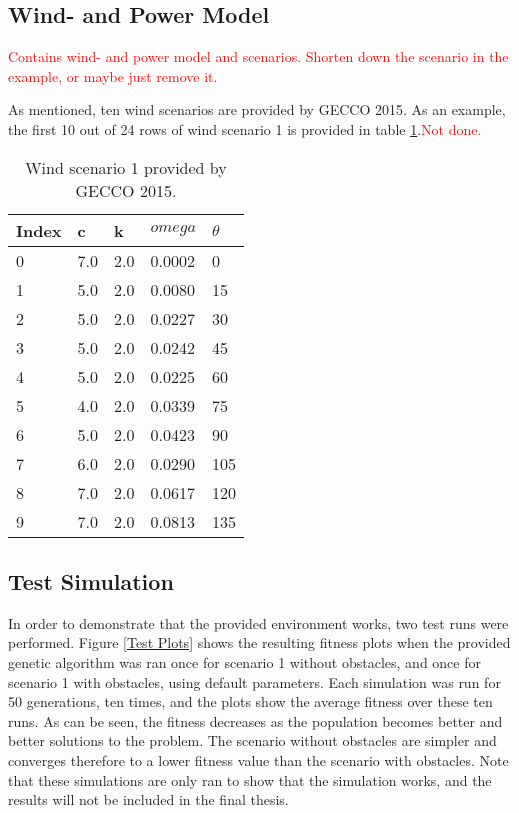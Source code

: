 \subsection{Wind- and Power Model}
\textcolor{red}{Contains wind- and power model and scenarios. Shorten down the scenario in the example, or maybe just remove it.}


As mentioned, ten wind scenarios are provided by GECCO 2015. As an example, the first 10 out of 24 rows of wind scenario 1 is provided in table \ref{Wind scenario 1}.\textcolor{red}{Not done.}


\begin{table}[h!]
\begin{center}
\caption{Wind scenario 1 provided by GECCO 2015.}
\label{Wind scenario 1}
\begin{tabular}{l|l|l|l|l}
\textbf{Index} & \textbf{c} & \textbf{k} & \textbf{$omega$} & \textbf{$\theta$} \\ 
\hline
0 & 7.0 & 2.0 & 0.0002 & 0 \\  
1 & 5.0 & 2.0 & 0.0080 & 15 \\ 
2 & 5.0 & 2.0 & 0.0227 & 30 \\ 
3 & 5.0 & 2.0 & 0.0242 & 45 \\ 
4 & 5.0 & 2.0 & 0.0225 & 60 \\ 
5 & 4.0 & 2.0 & 0.0339 & 75 \\ 
6 & 5.0 & 2.0 & 0.0423 & 90 \\ 
7 & 6.0 & 2.0 & 0.0290 & 105 \\ 
8 & 7.0 & 2.0 & 0.0617 & 120 \\ 
9 & 7.0 & 2.0 & 0.0813 & 135 \\ 
\end{tabular} 
\end{center}
\end{table}


\subsection{Test Simulation}
In order to demonstrate that the provided environment works, two test runs were performed. Figure \ref{Test Plots} shows the resulting fitness plots when the provided genetic algorithm was ran once for scenario 1 without obstacles, and once for scenario 1 with obstacles, using default parameters. Each simulation was run for 50 generations, ten times, and the plots show the average fitness over these ten runs. As can be seen, the fitness decreases as the population becomes better and better solutions to the problem. The scenario without obstacles are simpler and converges therefore to a lower fitness value than the scenario with obstacles. Note that these simulations are only ran to show that the simulation works, and the results will not be included in the final thesis. 


